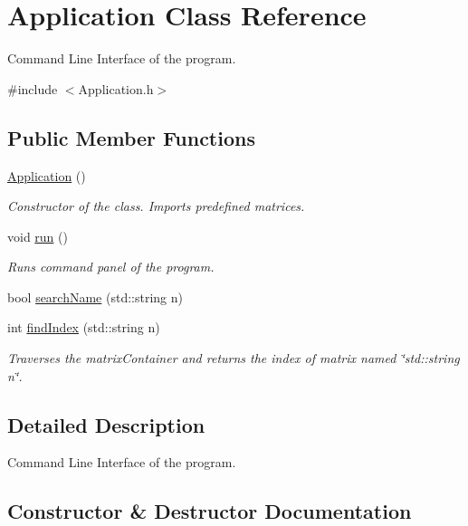 \hypertarget{class_application}{}\section{Application Class Reference}
\label{class_application}


Command Line Interface of the program.  




{\ttfamily \#include $<$Application.\+h$>$}

\subsection*{Public Member Functions}
\begin{DoxyCompactItemize}
\item 
\hyperlink{class_application_afa8cc05ce6b6092be5ecdfdae44e05f8}{Application} ()
\begin{DoxyCompactList}\small\item\em Constructor of the class. Imports predefined matrices. \end{DoxyCompactList}\item 
void \hyperlink{class_application_a68965449404743bf1add056784d6cf81}{run} ()
\begin{DoxyCompactList}\small\item\em Runs command panel of the program. \end{DoxyCompactList}\item 
bool \hyperlink{class_application_add6aceb17b23990e6867256496183bb1}{search\+Name} (std\+::string n)
\item 
int \hyperlink{class_application_ae79c4e186a04cb48c284b2a9c6228c8e}{find\+Index} (std\+::string n)
\begin{DoxyCompactList}\small\item\em Traverses the matrix\+Container and returns the index of matrix named \char`\"{}std\+::string n\char`\"{}. \end{DoxyCompactList}\end{DoxyCompactItemize}


\subsection{Detailed Description}
Command Line Interface of the program. 

\subsection{Constructor \& Destructor Documentation}
\mbox{\label{class_application_afa8cc05ce6b6092be5ecdfdae44e05f8}} 
